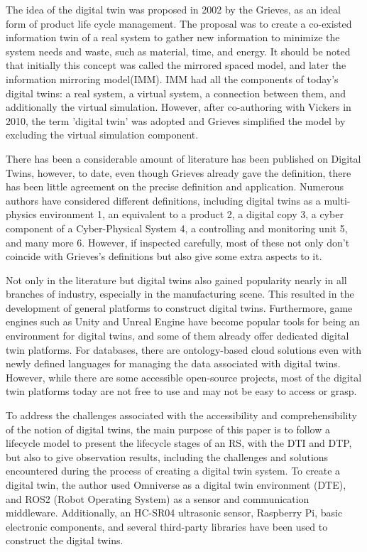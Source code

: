 \documentclass[conference]{IEEEtran}
\begin{document}
    The idea of the digital twin was proposed in 2002 by the Grieves,
    as an ideal form of product life cycle management.
    The proposal was to create a co-existed information twin of a real system to gather new information to minimize the system needs and waste,
    such as material, time, and energy. It should be noted that initially this concept was called the mirrored spaced model, and later the information mirroring model(IMM).
    IMM had all the components of today's digital twins: a real system, a virtual system,  a connection between them, and additionally the virtual simulation. 
    However, after co-authoring with Vickers in 2010, the term 'digital twin' was adopted and Grieves simplified the model by excluding the virtual simulation component.
    
    There has been a considerable amount of literature has been published on Digital Twins, 
    however, to date, even though Grieves already gave the definition, there has been little agreement on the precise definition and application. 
    Numerous authors have considered different definitions, including digital twins as a multi-physics environment 1, an equivalent to a product 2, 
    a digital copy 3, a cyber component of a Cyber-Physical System 4, a controlling and monitoring unit 5, and many more 6. However, if inspected carefully, 
    most of these not only don't coincide with Grieves's definitions but also give some extra aspects to it. 

    Not only in the literature but digital twins also gained popularity nearly in all branches of industry,
    especially in the manufacturing scene.  This resulted in the development of general platforms to construct digital twins. 
    Furthermore, game engines such as Unity and  Unreal Engine have become popular tools for being an environment for digital twins, 
    and some of them already offer dedicated digital twin platforms. For databases, there are ontology-based cloud solutions even with newly defined 
    languages for managing the data associated with digital twins. However, while there are some accessible open-source projects, most of the digital 
    twin platforms today are not free to use and may not be easy to access or grasp. 

    To address the challenges associated with the accessibility and comprehensibility of the notion of digital twins,
    the main purpose of this paper is to follow a lifecycle model to present the lifecycle stages of an RS, with the DTI and DTP,
    but also to give observation results, including the challenges and solutions encountered during the process of creating a digital twin system.
    To create a digital twin, the author used Omniverse as a digital twin environment (DTE), and ROS2 (Robot Operating System) as a sensor and communication middleware.
    Additionally, an HC-SR04 ultrasonic sensor, Raspberry Pi, basic electronic components, and several third-party libraries have been used to construct the digital twins. 
\end{document}
